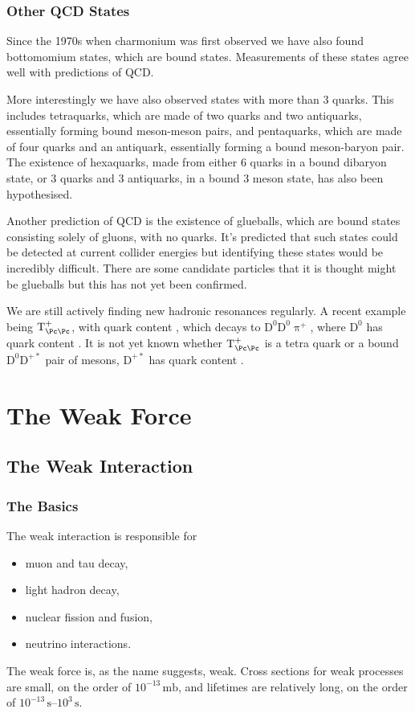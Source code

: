 \documentclass[fleqn]{NotesClass}
\makeatletter
\newcommand{\PBASE@pion}{\uppi}
\newcommand{\Ppiplus}{\ensuremath{\PBASE@pion^+}}
\makeatother
\begin{document}
    \section{Other QCD States}
    Since the 1970s when charmonium was first observed we have also found bottomomium states, which are bound \Pb\APb{} states.
    Measurements of these states agree well with predictions of QCD.
    
    More interestingly we have also observed states with more than 3 quarks.
    This includes tetraquarks, which are made of two quarks and two antiquarks, essentially forming bound meson-meson pairs, and pentaquarks, which are made of four quarks and an antiquark, essentially forming a bound meson-baryon pair.
    The existence of hexaquarks, made from either 6 quarks in a bound dibaryon state, or 3 quarks and 3 antiquarks, in a bound 3 meson state, has also been hypothesised.
    
    Another prediction of QCD is the existence of glueballs, which are bound states consisting solely of gluons, with no quarks.
    It's predicted that such states could be detected at current collider energies but identifying these states would be incredibly difficult.
    There are some candidate particles that it is thought might be glueballs but this has not yet been confirmed.
    
    We are still actively finding new hadronic resonances regularly.
    A recent example being \(\mathrm{T}_{\Pc\Pc}^+\), with quark content \Pc\Pc\APu\APd, which decays to \(\mathrm{D}^0\mathrm{D}^0\Ppiplus\), where \(\mathrm{D}^{0}\) has quark content \Pc\APu.
    It is not yet known whether \(\mathrm{T}_{\Pc\Pc}^+\) is a tetra quark or a bound \(\mathrm{D^0}\mathrm{D^{+*}}\) pair of mesons, \(\mathrm{D}^{+*}\) has quark content \Pc\APd.
    
    \part{The Weak Force}
    \chapter{The Weak Interaction}
    \section{The Basics}
    The weak interaction is responsible for
    \begin{itemize}
        \item muon and tau decay,
        \item light hadron decay,
        \item nuclear fission and fusion,
        \item neutrino interactions.
    \end{itemize}
    The weak force is, as the name suggests, weak.
    Cross sections for weak processes are small, on the order of \(10^{-13}\,\unit{\milli\barn}\), and lifetimes are relatively long, on the order of \(10^{-13}\,\unit{\second}\)--\(10^{3}\,\unit{\second}\).
    
\end{document}
